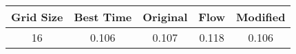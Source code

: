 \begin{tabular}{|c|c|c|c|c|}
\hline
Grid Size & Best Time & Original & Flow & Modified \\
\hline
16 & 0.106 & 0.107 & 0.118 & 0.106 \\
\hline
\end{tabular}